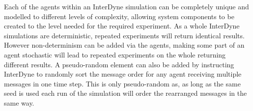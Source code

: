 \documentclass{article}
\begin{document}
Each of the agents within an InterDyne simulation can be completely unique and modelled to different levels of complexity, allowing system components to be created to the level needed for the required experiment. As a whole InterDyne simulations are deterministic, repeated experiments will return identical results. However non-determinism can be added via the agents, making some part of an agent stochastic will lead to repeated experiments on the whole returning different results. A pseudo-random element can also be added by instructing InterDyne to randomly sort the message order for any agent receiving multiple messages in one time step. This is only pseudo-random as, as long as the same seed is used each run of the simulation will order the rearranged messages in the same way.   
\end{document}
